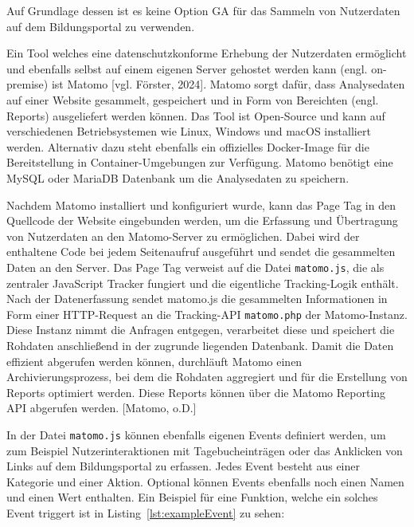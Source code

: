Auf Grundlage dessen ist es keine Option GA für das Sammeln von Nutzerdaten auf dem Bildungsportal zu verwenden. 

Ein Tool welches eine datenschutzkonforme Erhebung der Nutzerdaten ermöglicht und ebenfalls selbst auf einem eigenen Server gehostet werden kann (engl. on-premise) ist Matomo [vgl. Förster, 2024]. Matomo sorgt dafür, dass Analysedaten auf einer Website gesammelt, gespeichert und in Form von Bereichten (engl. Reports) ausgeliefert werden können.
Das Tool ist Open-Source und kann auf verschiedenen Betriebsystemen wie Linux, Windows und macOS installiert werden. Alternativ dazu steht ebenfalls ein offizielles Docker-Image für die Bereitstellung in Container-Umgebungen zur Verfügung. Matomo benötigt eine MySQL oder MariaDB Datenbank um die Analysedaten zu speichern. 

Nachdem Matomo installiert und konfiguriert wurde, kann das Page Tag in den Quellcode der Website eingebunden werden, um die Erfassung und Übertragung von Nutzerdaten an den Matomo-Server zu ermöglichen. Dabei wird der enthaltene Code bei jedem Seitenaufruf ausgeführt und sendet die gesammelten Daten an den Server. Das Page Tag verweist auf die Datei \texttt{matomo.js}, die als zentraler JavaScript Tracker fungiert und die eigentliche Tracking-Logik enthält. Nach der Datenerfassung sendet matomo.js die gesammelten Informationen in Form einer HTTP-Request an die Tracking-API \texttt{matomo.php} der Matomo-Instanz. Diese Instanz nimmt die Anfragen entgegen, verarbeitet diese und speichert die Rohdaten anschließend in der zugrunde liegenden Datenbank. Damit die Daten effizient abgerufen werden können, durchläuft Matomo einen Archivierungsprozess, bei dem die Rohdaten aggregiert und für die Erstellung von Reports optimiert werden. Diese Reports können über die Matomo Reporting API abgerufen werden. [Matomo, o.D.]

In der Datei \texttt{matomo.js} können ebenfalls eigenen Events definiert werden, um zum Beispiel Nutzerinteraktionen mit Tagebucheinträgen oder das Anklicken von Links auf dem Bildungsportal zu erfassen. Jedes Event besteht aus einer Kategorie und einer Aktion. Optional können Events ebenfalls noch einen Namen und einen Wert enthalten. Ein Beispiel für eine Funktion, welche ein solches Event triggert ist in Listing~\ref{lst:exampleEvent} zu sehen: 

\FloatBarrier


